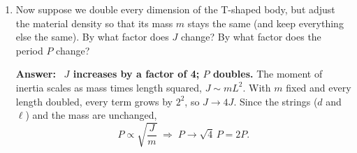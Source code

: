 \documentclass[11pt,letterpaper]{article}
\newenvironment{answer}{\par\vspace{4pt}\color{blue!60!black}\textbf{Answer:}\ }{\par\vspace{4pt}}
\begin{document}
\begin{enumerate}[label=\textbf{\arabic*.}, leftmargin=*, itemsep=4pt]
\item Now suppose we double every dimension of the T-shaped body, but adjust the material density so that its mass $m$ stays the same (and keep everything else the same). By what factor does $J$ change? By what factor does the period $P$ change?

\begin{answer}
\textbf{$J$ increases by a factor of 4; $P$ doubles.} The moment of inertia scales as mass times length squared, $J \sim m L^2$. With $m$ fixed and every length doubled, every term grows by $2^2$, so $J \to 4J$. Since the strings ($d$ and $\ell$) and the mass are unchanged,
\[
P \propto \sqrt{\frac{J}{m}} \;\Longrightarrow\; P \to \sqrt{4}\,P = 2P .
\]

\end{answer}

\end{enumerate}
\end{document}
